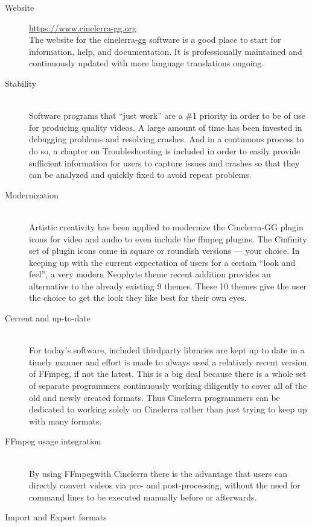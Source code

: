 \begin{description}
    \item[Website] \url{https://www.cinelerra-gg.org}\\
        The website for the cinelerra-gg software is a good place to start for information, help, and documentation. 
        It is professionally maintained and continuously updated with more language
        translations ongoing.
    \item[Stability] ~\\
        Software programs that “just work” are a \#1 priority in order to be of use for producing quality videos.
        A large amount of time has been invested in debugging problems and resolving crashes. 
        And in a continuous process to do so, a chapter on Troubleshooting is included in order to easily provide sufficient information for users to capture issues and crashes so that they can be analyzed and quickly fixed to avoid repeat problems.
    \item[Modernization] ~\\
        Artistic creativity has been applied to modernize the Cinelerra-GG plugin icons for video and audio to even include the ffmpeg plugins. 
        The Cinfinity set of plugin icons come in square or roundish versions --- your choice. 
        In keeping up with the current expectation of users for a certain “look and feel”, a very modern Neophyte theme recent addition provides an alternative to the already existing 9 themes. 
        These 10 themes give the user the choice to get the look they like best for their own eyes.
    \item[Cerrent and up-to-date] ~\\
        For today’s software, included thirdparty libraries are kept up to date in a timely manner and effort is made to always used a relatively recent version of FFmpeg, if not the latest. 
        This is a big deal because there is a whole set of separate programmers continuously working diligently to cover all of the old and newly created formats. 
        Thus Cinelerra programmers can be dedicated to working solely on Cinelerra rather than just trying to keep up with many formats.
    \item[FFmpeg usage integration]~\\
        By using FFmpegwith Cinelerra there is the advantage that users can directly convert videos via pre- and post-processing, without the need for command lines to be executed manually before or afterwards.
    \item[Import and Export formats] ~\\

\end{description}
